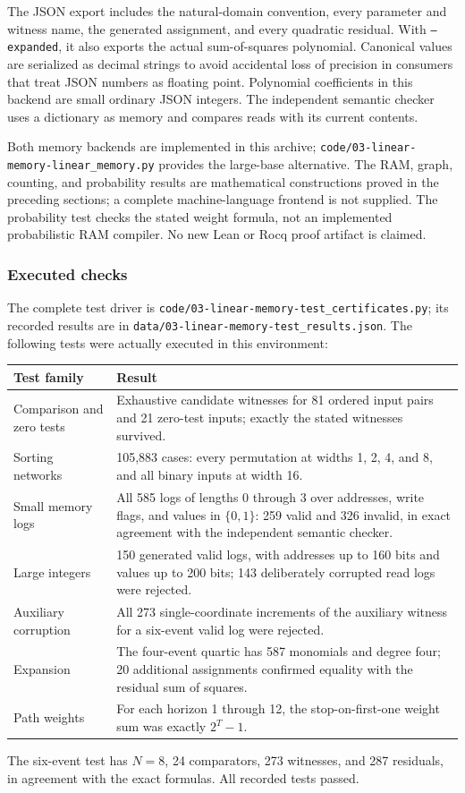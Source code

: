 \documentclass[11pt,a4paper]{article}
\theoremstyle{definition}
\theoremstyle{remark}
\newcommand{\repo}[1]{\nolinkurl{#1}}
\begin{document}
The JSON export includes the natural-domain convention, every parameter and
witness name, the generated assignment, and every quadratic residual. With
\texttt{--expanded}, it also exports the actual sum-of-squares polynomial.
Canonical values are serialized as decimal strings to avoid accidental loss
of precision in consumers that treat JSON numbers as floating point.
Polynomial coefficients in this backend are small ordinary JSON integers.
The independent semantic checker uses a dictionary as memory and compares
reads with its current contents.

Both memory backends are implemented in this archive;
\repo{code/03-linear-memory-linear_memory.py} provides the large-base alternative. The RAM, graph,
counting, and probability results are mathematical constructions proved in the
preceding sections; a complete machine-language frontend is not supplied.
The probability test checks the stated weight formula, not an implemented
probabilistic RAM compiler. No new Lean or Rocq proof artifact is claimed.

\subsubsection{Executed checks}
The complete test driver is \repo{code/03-linear-memory-test_certificates.py}; its recorded
results are in \repo{data/03-linear-memory-test_results.json}. The following tests were
actually executed in this environment:
\begin{center}
\begin{tabularx}{\textwidth}{@{}p{}X@{}}
\toprule
Test family & Result \\
\midrule
Comparison and zero tests & Exhaustive candidate witnesses for 81 ordered
input pairs and 21 zero-test inputs; exactly the stated witnesses survived.\\
Sorting networks & 105,883 cases: every permutation at widths 1, 2, 4, and 8,
and all binary inputs at width 16.\\
Small memory logs & All 585 logs of lengths 0 through 3 over addresses,
write flags, and values in $\{0,1\}$: 259 valid and 326 invalid, in exact
agreement with the independent semantic checker.\\
Large integers & 150 generated valid logs, with addresses up to 160 bits and
values up to 200 bits; 143 deliberately corrupted read logs were rejected.\\
Auxiliary corruption & All 273 single-coordinate increments of the auxiliary
witness for a six-event valid log were rejected.\\
Expansion & The four-event quartic has 587 monomials and degree four;
20 additional assignments confirmed equality with the residual sum of squares.\\
Path weights & For each horizon 1 through 12, the stop-on-first-one weight sum
was exactly $2^T-1$.\\
\bottomrule
\end{tabularx}
\end{center}
The six-event test has $N=8$, 24 comparators, 273 witnesses, and 287 residuals,
in agreement with the exact formulas. All recorded tests passed.
\end{document}
